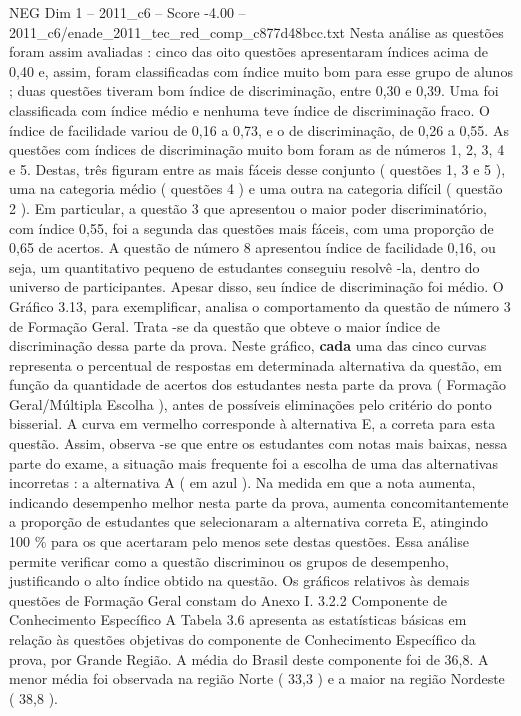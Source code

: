 \begin{textsample}{NEG Dim 1 – 2011\_c6 – Score -4.00 – 2011\_c6/enade\_2011\_tec\_red\_comp\_c877d48bcc.txt}
Nesta análise as questões foram assim avaliadas : cinco das oito questões apresentaram índices acima de 0,40 e, assim, foram classificadas com índice muito bom para esse grupo de alunos ; duas questões tiveram bom índice de discriminação, entre 0,30 e 0,39.
Uma foi classificada com índice médio e nenhuma teve índice de discriminação fraco.
O índice de facilidade variou de 0,16 a 0,73, e o de discriminação, de 0,26 a 0,55.
As questões com índices de discriminação muito bom foram as de números 1, 2, 3, 4 e 5.
Destas, três figuram entre as mais fáceis desse conjunto ( questões 1, 3 e 5 ), uma na categoria médio ( questões 4 ) e uma outra na categoria difícil ( questão 2 ).
Em particular, a questão 3 que apresentou o maior poder discriminatório, com índice 0,55, foi a segunda das questões mais fáceis, com uma proporção de 0,65 de acertos.
A questão de número 8 apresentou índice de facilidade 0,16, ou seja, um quantitativo pequeno de estudantes conseguiu resolvê -la, dentro do universo de participantes.
Apesar disso, seu índice de discriminação foi médio.
O Gráfico 3.13, para exemplificar, analisa o comportamento da questão de número 3 de Formação Geral.
Trata -se da questão que obteve o maior índice de discriminação dessa parte da prova.
Neste gráfico, \textbf{cada} uma das cinco curvas representa o percentual de respostas em determinada alternativa da questão, em função da quantidade de acertos dos estudantes nesta parte da prova ( Formação Geral/Múltipla Escolha ), antes de possíveis eliminações pelo critério do ponto bisserial.
A curva em vermelho corresponde à alternativa E, a correta para esta questão.
Assim, observa -se que entre os estudantes com notas mais baixas, nessa parte do exame, a situação mais frequente foi a escolha de uma das alternativas incorretas : a alternativa A ( em azul ).
Na medida em que a nota aumenta, indicando desempenho melhor nesta parte da prova, aumenta concomitantemente a proporção de estudantes que selecionaram a alternativa correta E, atingindo 100 \% para os que acertaram pelo menos sete destas questões.
Essa análise permite verificar como a questão discriminou os grupos de desempenho, justificando o alto índice obtido na questão.
Os gráficos relativos às demais questões de Formação Geral constam do Anexo I. 3.2.2 Componente de Conhecimento Específico A Tabela 3.6 apresenta as estatísticas básicas em relação às questões objetivas do componente de Conhecimento Específico da prova, por Grande Região.
A média do Brasil deste componente foi de 36,8.
A menor média foi observada na região Norte ( 33,3 ) e a maior na região Nordeste ( 38,8 ).

\end{textsample}
